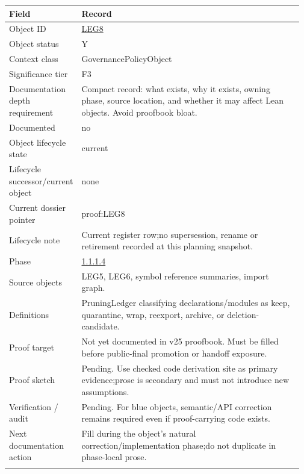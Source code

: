 \begin{longtable}{L{0.16\linewidth} L{0.81\linewidth}}
\hline
\textbf{Field} & \textbf{Record}\\
\hline
Object ID & \hyperlink{object-row-LEG8}{LEG8}\\
\hline\addlinespace[0.20em]
Object status & Y\\
\hline\addlinespace[0.20em]
Context class & GovernancePolicyObject\\
\hline\addlinespace[0.20em]
Significance tier & F3\\
\hline\addlinespace[0.20em]
Documentation depth requirement & Compact record: what exists, why it exists, owning phase, source location, and whether it may affect Lean objects. Avoid proofbook bloat.\\
\hline\addlinespace[0.20em]
Documented & no\\
\hline\addlinespace[0.20em]
Object lifecycle state & current\\
\hline\addlinespace[0.20em]
Lifecycle successor/\allowbreak{}current object & none\\
\hline\addlinespace[0.20em]
Current dossier pointer & proof:LEG8\\
\hline\addlinespace[0.20em]
Lifecycle note & Current register row;\newline no supersession, rename or retirement recorded at this planning snapshot.\\
\hline\addlinespace[0.20em]
Phase & \hyperlink{phase-row-1-1-1-4}{1.1.1.4}\\
\hline\addlinespace[0.20em]
Source objects & LEG5, LEG6, symbol reference summaries, import graph.\\
\hline\addlinespace[0.20em]
Definitions & PruningLedger classifying declarations/\allowbreak{}modules as keep, quarantine, wrap, reexport, archive, or deletion-candidate.\\
\hline\addlinespace[0.20em]
Proof target & Not yet documented in v25 proofbook. Must be filled before public-final promotion or handoff exposure.\\
\hline\addlinespace[0.20em]
Proof sketch & Pending. Use checked code derivation site as primary evidence;\newline prose is secondary and must not introduce new assumptions.\\
\hline\addlinespace[0.20em]
Verification /\allowbreak{} audit & Pending. For blue objects, semantic/\allowbreak{}API correction remains required even if proof-carrying code exists.\\
\hline\addlinespace[0.20em]
Next documentation action & Fill during the object's natural correction/\allowbreak{}implementation phase;\newline do not duplicate in phase-local prose.\\
\hline\addlinespace[0.20em]
\end{longtable}
